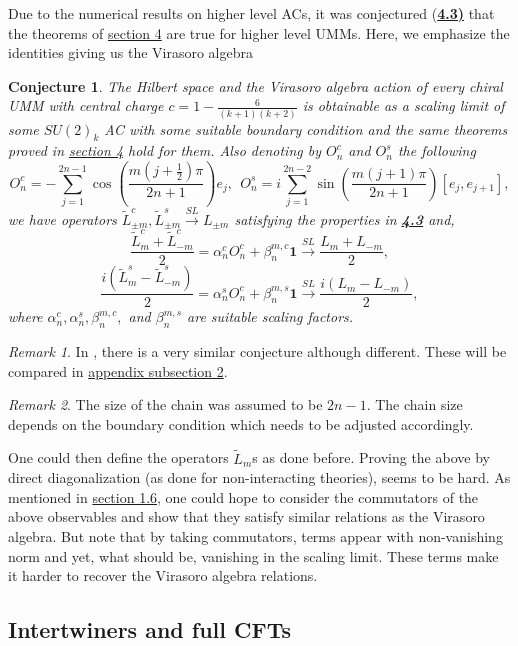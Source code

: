 \documentclass[twoside,11pt,titlepage]{amsart}
\renewcommand{\=}[1]{\stackrel{#1}{=}} %
\newtheorem{cnj}[thm]{Conjecture}
\theoremstyle{definition}
\theoremstyle{remark}
\newtheorem{rmk}{Remark}
\begin{document}
Due to the numerical results on higher level ACs, it was conjectured (\hyperref[cnj4.3]{\textbf{4.3)}} that the theorems of \hyperref[4]{section 4} are true for higher level UMMs. Here, we emphasize the identities giving us the Virasoro algebra 
\begin{cnj}\label{cnj5.5}
The Hilbert space and the Virasoro algebra action of every chiral UMM with central charge $c=1-\frac{6}{(k+1)(k+2)}$ is obtainable as a scaling limit of some $SU(2)_k$ AC with some suitable boundary condition and the same theorems proved in \hyperref[4]{section 4} hold for them. Also denoting by $O_n^c$ and $O_n^s$ the following
$$O_n^c=-\sum_{j=1}^{2n-1}\cos(\frac{m(j+\frac{1}{2})\pi}{2n+1})e_j, \ \ O_n^s=i\sum_{j=1}^{2n-2}\sin(\frac{m(j+1)\pi}{2n+1})[e_j,e_{j+1}],$$
we have operators $\widetilde{L}_{\pm m}^{c},\widetilde{L}_{\pm m}^{s} \xrightarrow{SL} L_{\pm m}$ satisfying the properties in \hyperref[cnj4.3]{\textbf{4.3}} and,
$$\frac{\widetilde{L}_m^c+\widetilde{L}_{-m}^c}{2}=\alpha_n^cO_n^c+\beta_n^{m,c}\textbf{1} \xrightarrow{SL} \frac{L_m+L_{-m}}{2},$$
$$ \frac{i(\widetilde{L}_m^s-\widetilde{L}_{-m}^s)}{2}=\alpha_n^sO_n^c+\beta_n^{m,s}\textbf{1} \xrightarrow{SL} \frac{i(L_m-L_{-m})}{2},$$ 
where $\alpha_n^c,\alpha_n^s,\beta_n^{m,c},$ and $\beta_n^{m,s}$ are suitable scaling factors.
\end{cnj}
\begin{rmk}\label{rmk14}
In \cite[(7.5)]{koo1994representations}, there is a very similar conjecture although different. These will be compared in \hyperref[A.2]{appendix subsection 2}.
\end{rmk}
\begin{rmk}\label{rmk15}
The size of the chain was assumed to be $2n-1$. The chain size depends on the boundary condition which needs to be adjusted accordingly. 
\end{rmk}
One could then define the operators $\widetilde{L}_m$s as done before. Proving the above by direct diagonalization (as done for non-interacting theories), seems to be hard. As mentioned in \hyperref[1.6]{section 1.6}, one could hope to consider the commutators of the above observables and show that they satisfy similar relations as the Virasoro algebra. But note that by taking commutators, terms appear with non-vanishing norm and yet, what should be, vanishing in the scaling limit. These terms make it harder to recover the Virasoro algebra relations.

\subsection{Intertwiners and full CFTs}\label{5.2}
\end{document}
